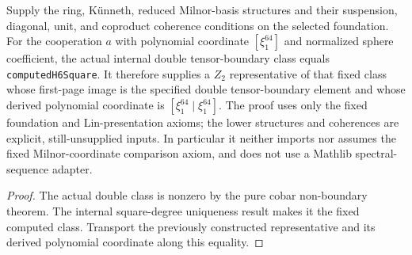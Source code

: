 \begin{proposition}
  \label{prop:h6-computed-double-representative}
  \notready
  Supply the ring, K\"unneth, reduced Milnor-basis structures and their
  suspension, diagonal, unit, and coproduct coherence conditions on the
  selected foundation. For the cooperation $a$ with polynomial coordinate
  $[\xi_1^{64}]$ and normalized sphere coefficient, the actual internal
  double tensor-boundary class equals \texttt{computedH6Square}.
  It therefore supplies a $Z_2$ representative of that fixed class whose
  first-page image is the specified double tensor-boundary element and
  whose derived polynomial coordinate is $[\xi_1^{64}\mid\xi_1^{64}]$.
  The proof uses only the fixed foundation and Lin-presentation axioms;
  the lower structures and coherences are explicit, still-unsupplied inputs.
  In particular it neither imports nor assumes the fixed Milnor-coordinate
  comparison axiom, and does not use a Mathlib spectral-sequence adapter.
\end{proposition}
\begin{proof}
  The actual double class is nonzero by the pure cobar non-boundary theorem.
  The internal square-degree uniqueness result makes it the fixed computed
  class. Transport the previously constructed representative and its
  derived polynomial coordinate along this equality.
\end{proof}

